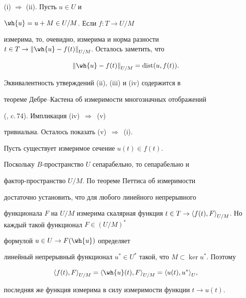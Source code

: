 \begin{pf}


(i) $\Rightarrow$ (ii). Пусть $u \in U$ и


$\wh {u} = u+M \in U/M$. Если $f:T \to U/M$


измерима, то, очевидно, измерима и норма разности $t \in T \to


{\|\wh {u}-f(t)\|}_{U/M}$. Осталось заметить, что


$$


{\|\wh {u}-f(t)\|}_{U/M}=\dist(u,f(t)).


$$





Эквивалентность утверждений (ii), (iii) и (iv) содержится в


теореме Дебре--Кастена об измеримости многозначных отображений


(\cite{IoffeLevi}, c.\,74). Импликация (iv)~$\Rightarrow$~(v)


тривиальна. Осталось показать (v)~$\Rightarrow$~(i).





Пусть существует измеримое сечение $u(t) \in f(t)$.


Поскольку $B$-пространство $U$ сепарабельно, то сепарабельно и


фактор-пространство $U/M$. По теореме Петтиса об измеримости


достаточно установить, что для любого линейного непрерывного


функционала $F$ на $U/M$ измерима скалярная функция $t\in T \to


{\la f(t),F\ra}_{U/M}$. Но каждый такой функционал $F \in (U/M)^*$


формулой $u \in U \to F(\wh {u})$ определяет


линейный непрерывный функционал $u^* \in U^*$ такой, что $M


\subset \ker u^*$. Поэтому


$$


{\la f(t),F\ra }_{U/M}={\la \wh {u}(t),F\ra}_{U/M}=


{\la u(t),u^*\ra}_U,


$$


последняя же функция измерима в силу измеримости функции $t \to


u(t)$.


\end{pf}






